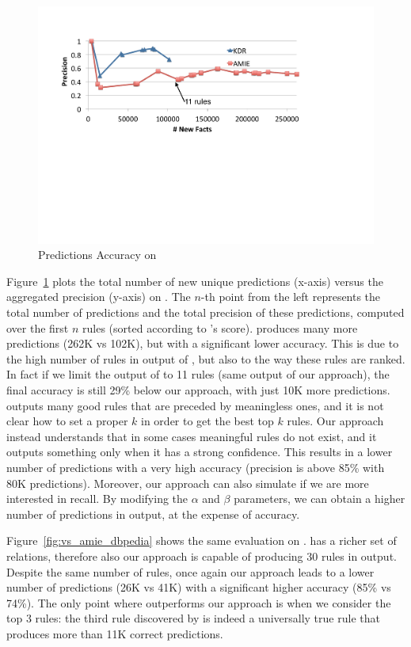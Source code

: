 \begin{figure}[t]
	\centering
	\includegraphics[width=\columnwidth]{include/figure/vsAmieYago.pdf}
	\caption{Predictions Accuracy on \yago}
	\label{fig:vs_amie_yago}
\end{figure}

Figure~\ref{fig:vs_amie_yago} plots the total number of new unique predictions (x-axis) versus the aggregated precision (y-axis) on \yago. The $n$-th point from the left represents the total number of predictions and the total precision of these predictions, computed over the first $n$ rules (sorted according to \amie's score). \amie produces many more predictions (262K vs 102K), but with a significant lower accuracy. This is due to the high number of rules in output of \amie, but also to the way these rules are ranked. In fact if we limit the output of \amie to 11 rules (same output of our approach), the final accuracy is still 29\% below our approach, with just 10K more predictions. \amie outputs many good rules that are preceded by meaningless ones, and it is not clear how to set a proper $k$ in order to get the best top $k$ rules. Our approach instead understands that in some cases meaningful rules do not exist, and it outputs something only when it has a strong confidence. This results in a lower number of predictions with a very high accuracy (precision is above 85\% with 80K predictions). Moreover, our approach can also simulate \amie if we are more interested in recall. By modifying the $\alpha$ and $\beta$ parameters, we can obtain a higher number of predictions in output, at the expense of accuracy. 

Figure~\ref{fig:vs_amie_dbpedia} shows the same evaluation on \dbpedia. \dbpedia has a richer set of relations, therefore also our approach is capable of producing 30 rules in output. Despite the same number of rules, once again our approach leads to a lower number of predictions (26K vs 41K) with a significant higher accuracy (85\% vs 74\%). The only point where \amie outperforms our approach is when we consider the top 3 rules: the third rule discovered by \amie is indeed a universally true rule that produces more than 11K correct predictions.

